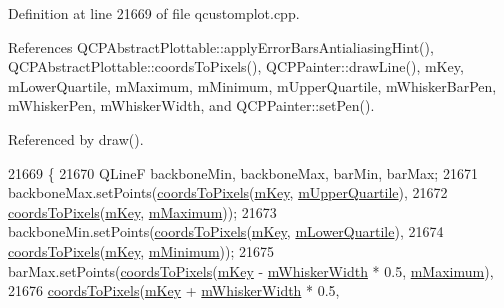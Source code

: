 Definition at line 21669 of file qcustomplot.\+cpp.



References Q\+C\+P\+Abstract\+Plottable\+::apply\+Error\+Bars\+Antialiasing\+Hint(), Q\+C\+P\+Abstract\+Plottable\+::coords\+To\+Pixels(), Q\+C\+P\+Painter\+::draw\+Line(), m\+Key, m\+Lower\+Quartile, m\+Maximum, m\+Minimum, m\+Upper\+Quartile, m\+Whisker\+Bar\+Pen, m\+Whisker\+Pen, m\+Whisker\+Width, and Q\+C\+P\+Painter\+::set\+Pen().



Referenced by draw().


\begin{DoxyCode}
21669                                                               \{
21670   QLineF backboneMin, backboneMax, barMin, barMax;
21671   backboneMax.setPoints(\hyperlink{class_q_c_p_abstract_plottable_ade710a776104b14c1c835168ce1bfc5c}{coordsToPixels}(\hyperlink{class_q_c_p_statistical_box_a86fd1d3be5c5bc11d11eda7517069af4}{mKey}, \hyperlink{class_q_c_p_statistical_box_a865afbcca332ee851aa45807381bc80e}{mUpperQuartile}),
21672                         \hyperlink{class_q_c_p_abstract_plottable_ade710a776104b14c1c835168ce1bfc5c}{coordsToPixels}(\hyperlink{class_q_c_p_statistical_box_a86fd1d3be5c5bc11d11eda7517069af4}{mKey}, \hyperlink{class_q_c_p_statistical_box_a16266f1e0e4e8e95b5d141c49479ef2e}{mMaximum}));
21673   backboneMin.setPoints(\hyperlink{class_q_c_p_abstract_plottable_ade710a776104b14c1c835168ce1bfc5c}{coordsToPixels}(\hyperlink{class_q_c_p_statistical_box_a86fd1d3be5c5bc11d11eda7517069af4}{mKey}, \hyperlink{class_q_c_p_statistical_box_acac86cac93d9fa3d820b5aaa04ed96f6}{mLowerQuartile}),
21674                         \hyperlink{class_q_c_p_abstract_plottable_ade710a776104b14c1c835168ce1bfc5c}{coordsToPixels}(\hyperlink{class_q_c_p_statistical_box_a86fd1d3be5c5bc11d11eda7517069af4}{mKey}, \hyperlink{class_q_c_p_statistical_box_a7143ece4e7e5f9ac010739fbc390bf0c}{mMinimum}));
21675   barMax.setPoints(\hyperlink{class_q_c_p_abstract_plottable_ade710a776104b14c1c835168ce1bfc5c}{coordsToPixels}(\hyperlink{class_q_c_p_statistical_box_a86fd1d3be5c5bc11d11eda7517069af4}{mKey} - \hyperlink{class_q_c_p_statistical_box_a4d166474f845d5db626e8b11a0815a6f}{mWhiskerWidth} * 0.5, 
      \hyperlink{class_q_c_p_statistical_box_a16266f1e0e4e8e95b5d141c49479ef2e}{mMaximum}),
21676                    \hyperlink{class_q_c_p_abstract_plottable_ade710a776104b14c1c835168ce1bfc5c}{coordsToPixels}(\hyperlink{class_q_c_p_statistical_box_a86fd1d3be5c5bc11d11eda7517069af4}{mKey} + \hyperlink{class_q_c_p_statistical_box_a4d166474f845d5db626e8b11a0815a6f}{mWhiskerWidth} * 0.5, 

\end{DoxyCode}
